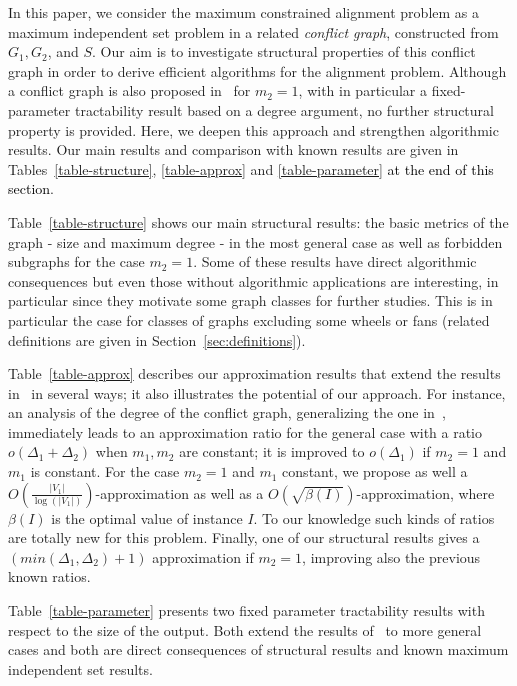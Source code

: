 \documentclass[final]{dmtcs-episciences}
\newcommand\mar[1]{\textcolor{black}{#1}}
\begin{document}
In this paper, we consider the maximum constrained alignment problem as a maximum independent set  problem in a related  \emph{ conflict graph}, constructed from $G_1, G_2$, and $S$. Our aim is to investigate structural properties of this conflict graph in order to derive efficient  algorithms for the alignment problem. Although  
a conflict graph is also proposed in~\citet{Fertin200990} for $m_2=1$, with in particular a fixed-parameter tractability result based on a degree argument, no further structural property is provided. Here, we deepen this approach and strengthen algorithmic results.
Our main results and comparison with known results are given in Tables~\ref{table-structure},  \ref{table-approx} and \ref{table-parameter} \mar{at the end of this section}. 

Table~\ref{table-structure} shows our main structural results: the basic metrics of the graph \-- size and maximum degree \-- in the most general case as well as forbidden subgraphs for the case $m_2=1$. Some of these results have direct algorithmic consequences but even those without algorithmic applications are interesting, in particular since they motivate some graph classes for further studies. This is in particular the case for classes of graphs excluding some wheels or fans (related definitions are given in Section~\ref{sec:definitions}).

Table~\ref{table-approx} describes our approximation results that
extend the results in~\citet{Fertin200990} in several ways; it also illustrates  the potential of our approach. For instance,  an analysis of the degree of the conflict graph, generalizing the one in~\citet{Fertin200990},  immediately leads to an approximation ratio for the  general case  with a ratio $o(\Delta_1+\Delta_2)$ when $m_1, m_2$ are constant; it is improved to $o(\Delta_1)$ if $m_2=1$ and $m_1$ is constant. For the case $m_2=1$ and $m_1$ constant, we propose as well a $O\left(\frac{|V_1|}{\log(|V_1|)}\right)$-approximation as well as a $O(\sqrt{\beta(I)})$-approximation, where $\beta(I)$ is the optimal value of instance $I$. To our knowledge such kinds of ratios are totally new for this problem. Finally, one of our structural results gives a $(min(\Delta_1, \Delta_2)+1)$ approximation if $m_2=1$, improving also the previous known ratios. 

Table~\ref{table-parameter} presents two fixed parameter tractability results with respect to the size of the output. Both extend the results of~\citet{Fertin200990} to more general cases and both are direct consequences of structural results and known maximum independent set results. 
\end{document}
